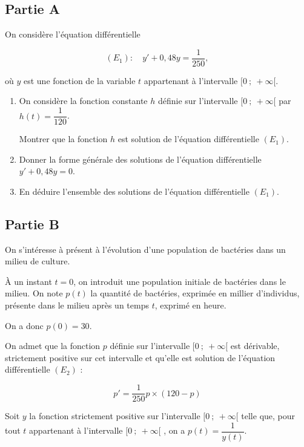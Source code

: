 \subsection*{Partie A}

On considère l'équation différentielle 

\[(E_1) :\quad  y' + 0{,}48y = \dfrac{1}{250},\]

où $y$ est une fonction de la variable $t$ appartenant à l'intervalle $[0~;~ +\infty[$.

\begin{enumerate}
\item On considère la fonction constante $h$ définie sur l'intervalle $[0~;~ +\infty[$ par $h(t) = \dfrac{1}{120}$.

Montrer que la fonction $h$ est solution de l'équation différentielle $(E_1)$.
\item Donner la forme générale des solutions de l'équation différentielle $y' + 0,48y = 0$.
\item En déduire l'ensemble des solutions de l'équation différentielle $(E_1)$.
\end{enumerate}

\subsection*{Partie B}

On s'intéresse à présent à l'évolution d'une population de bactéries dans un milieu de culture.

À un instant $t = 0$, on introduit une population initiale de  bactéries dans le milieu. On note $p(t)$ la quantité de bactéries, exprimée en millier d'individus, présente dans le milieu après un temps $t$, exprimé en heure.

On a donc $p(0) = 30$.

On admet que la fonction $p$ définie sur l'intervalle $[0~;~ +\infty[$ est dérivable, strictement positive sur cet intervalle et qu'elle est solution de l'équation différentielle $(E_2)$ :

\[p' = \dfrac{1}{250}p \times (120 - p)\]

Soit $y$ la fonction strictement positive sur l'intervalle $[0~;~ +\infty[$ telle que, pour tout $t$ appartenant à l'intervalle $[0~;~ +\infty[$ , on a $p(t) = \dfrac{1}{y(t)}$.

\medskip

